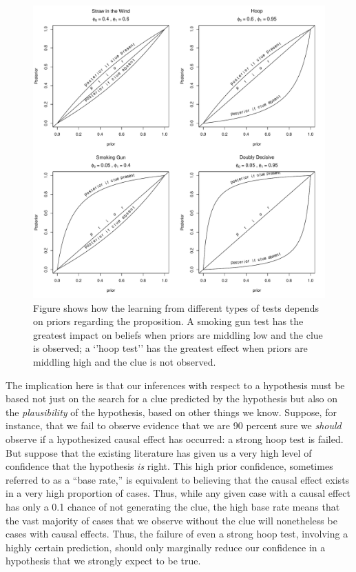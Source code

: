 \documentclass[
  12pt,
]{book}
\begin{document}
\begin{figure}
\centering
\includegraphics{ii_files/figure-latex/CluesInferences2-1.pdf}
\caption{\label{fig:CluesInferences2}Figure shows how the learning from different types of tests depends on priors regarding the proposition. A smoking gun test has the greatest impact on beliefs when priors are middling low and the clue is observed; a `'hoop test'' has the greatest effect when priors are middling high and the clue is not observed.}
\end{figure}

The implication here is that our inferences with respect to a hypothesis must be based not just on the search for a clue predicted by the hypothesis but also on the \emph{plausibility} of the hypothesis, based on other things we know. Suppose, for instance, that we fail to observe evidence that we are 90 percent sure we \emph{should} observe if a hypothesized causal effect has occurred: a strong hoop test is failed. But suppose that the existing literature has given us a very high level of confidence that the hypothesis \emph{is} right. This high prior confidence, sometimes referred to as a ``base rate,'' is equivalent to believing that the causal effect exists in a very high proportion of cases. Thus, while any given case with a causal effect has only a 0.1 chance of not generating the clue, the high base rate means that the vast majority of cases that we observe without the clue will nonetheless be cases with causal effects. Thus, the failure of even a strong hoop test, involving a highly certain prediction, should only marginally reduce our confidence in a hypothesis that we strongly expect to be true.
\end{document}
